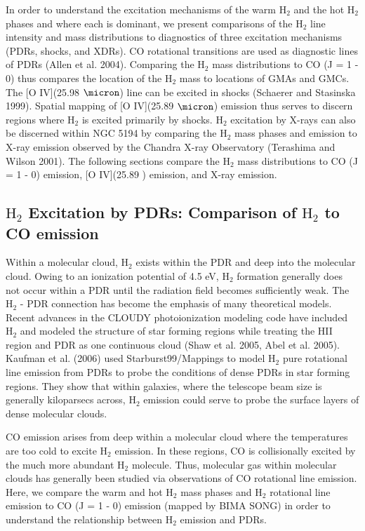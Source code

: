 \documentclass[manuscript]{aastex}
\begin{document}
In order to understand the excitation mechanisms of the warm $\mathrm{H_2}$ and the hot $\mathrm{H_2}$ phases and where each is dominant, we present comparisons of the $\mathrm{H_2}$ line intensity and mass distributions to diagnostics of three excitation mechanisms (PDRs, shocks, and XDRs).  CO rotational transitions are used as diagnostic lines of PDRs (Allen et al. 2004).  Comparing the $\mathrm{H_2}$ mass distributions to CO (J = 1 - 0) thus compares the location of the $\mathrm{H_2}$ mass to locations of GMAs and GMCs.  The [O IV](25.98 $\micron$) line can be excited in shocks (Schaerer and Stasinska 1999).  Spatial mapping of [O IV](25.89 $\micron$) emission thus serves to discern regions where $\mathrm{H_2}$ is excited primarily by shocks.  $\mathrm{H_2}$ excitation by X-rays can also be discerned within NGC 5194 by comparing the $\mathrm{H_2}$ mass phases and emission to X-ray emission observed by the Chandra X-ray Observatory (Terashima and Wilson 2001).  The following sections compare the $\mathrm{H_2}$ mass distributions to CO (J = 1 - 0) emission, [O IV](25.89 \micron) emission, and X-ray emission.

\subsection{$\mathrm{H_2}$ Excitation by PDRs: Comparison of $\mathrm{H_2}$ to CO emission}

Within a molecular cloud, $\mathrm{H_2}$ exists within the PDR and deep into the molecular cloud.  Owing to an ionization potential of 4.5 eV, $\mathrm{H_2}$ formation generally does not occur within a PDR until the radiation field  becomes sufficiently weak.  The $\mathrm{H_2}$ - PDR connection has become the emphasis of many theoretical models.  Recent advances in the CLOUDY photoionization modeling code have included $\mathrm{H_2}$ and modeled the structure of star forming regions while treating the HII region and PDR as one continuous cloud (Shaw et al. 2005, Abel et al. 2005).  Kaufman et al. (2006) used Starburst99/Mappings to model $\mathrm{H_2}$ pure rotational line emission from PDRs to probe the conditions of dense PDRs in star forming regions.  They show that within galaxies, where the telescope beam size is generally kiloparsecs across, $\mathrm{H_2}$ emission could serve to probe the surface layers of dense molecular clouds.

CO emission arises from deep within a molecular cloud where the temperatures are too cold to excite $\mathrm{H_2}$ emission.  In these regions, CO is collisionally excited by the much more abundant $\mathrm{H_2}$ molecule.  Thus, molecular gas within molecular clouds has generally been studied via observations of CO rotational line emission.  Here, we compare the warm and hot $\mathrm{H_2}$ mass phases and $\mathrm{H_2}$ rotational line emission to CO (J = 1 - 0) emission (mapped  by BIMA SONG) in order to understand the relationship between $\mathrm{H_2}$ emission and PDRs.
\end{document}

